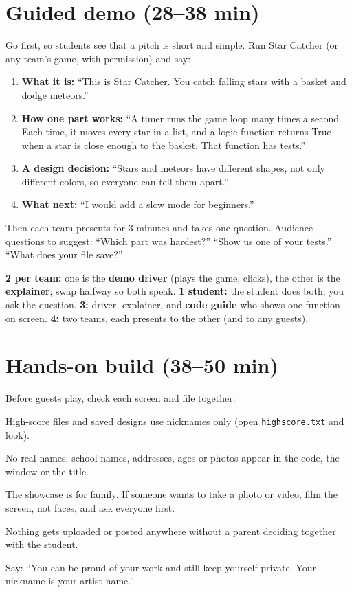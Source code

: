\section{Guided demo (28--38 min)}
\begin{workedexample}
Go first, so students see that a pitch is short and simple. Run Star Catcher (or any team's game, with
permission) and say:
\begin{enumerate}
  \item \textbf{What it is:} \enquote{This is Star Catcher. You catch falling stars with a basket and dodge meteors.}
  \item \textbf{How one part works:} \enquote{A timer runs the game loop many times a second. Each time, it moves every star in a list, and a logic function returns True when a star is close enough to the basket. That function has tests.}
  \item \textbf{A design decision:} \enquote{Stars and meteors have different shapes, not only different colors, so everyone can tell them apart.}
  \item \textbf{What next:} \enquote{I would add a slow mode for beginners.}
\end{enumerate}
Then each team presents for 3 minutes and takes one question. Audience questions to suggest:
\enquote{Which part was hardest?} \enquote{Show us one of your tests.} \enquote{What does your file save?}
\end{workedexample}

\begin{pairroles}
\textbf{2 per team:} one is the \textbf{demo driver} (plays the game, clicks), the other is the
\textbf{explainer}; swap halfway so both speak. \textbf{1 student:} the student does both; you ask the
question. \textbf{3:} driver, explainer, and \textbf{code guide} who shows one function on screen.
\textbf{4:} two teams, each presents to the other (and to any guests).
\end{pairroles}

\section{Hands-on build (38--50 min)}
\begin{safety}
Before guests play, check each screen and file together:
\begin{checklist}
  \item High-score files and saved designs use nicknames only (open \texttt{highscore.txt} and look).
  \item No real names, school names, addresses, ages or photos appear in the code, the window or the title.
  \item The showcase is for family. If someone wants to take a photo or video, film the screen, not faces, and ask everyone first.
  \item Nothing gets uploaded or posted anywhere without a parent deciding together with the student.
\end{checklist}
Say: \enquote{You can be proud of your work and still keep yourself private. Your nickname is your artist name.}
\end{safety}

